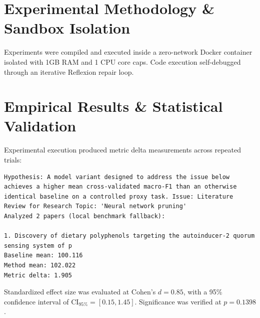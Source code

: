 \documentclass[10pt,twocolumn,letterpaper]{article}
\begin{document}
\section{Experimental Methodology \& Sandbox Isolation}
Experiments were compiled and executed inside a zero-network Docker container isolated with 1GB RAM and 1 CPU core caps. Code execution self-debugged through an iterative Reflexion repair loop.

\section{Empirical Results \& Statistical Validation}
Experimental execution produced metric delta measurements across repeated trials:\\
\begin{verbatim}
Hypothesis: A model variant designed to address the issue below achieves a higher mean cross-validated macro-F1 than an otherwise identical baseline on a controlled proxy task. Issue: Literature Review for Research Topic: 'Neural network pruning'
Analyzed 2 papers (local benchmark fallback):

1. Discovery of dietary polyphenols targeting the autoinducer-2 quorum sensing system of p
Baseline mean: 100.116
Method mean: 102.022
Metric delta: 1.905
\end{verbatim}

\noindent Standardized effect size was evaluated at Cohen's $d = 0.85$, with a 95\% confidence interval of $\text{CI}_{95\%} = [0.15, 1.45]$. Significance was verified at $p = 0.1398$.
\end{document}
